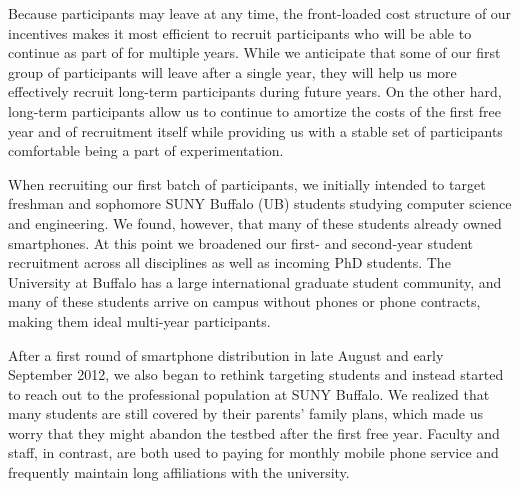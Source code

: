 Because participants may leave at any time, the front-loaded cost structure
of our incentives makes it most efficient to recruit participants who will be
able to continue as part of \PhoneLab{} for multiple years. While we
anticipate that some of our first group of participants will leave after a
single year, they will help us more effectively recruit long-term
participants during future years. On the other hard, long-term participants
allow us to continue to amortize the costs of the first free year and of
recruitment itself while providing us with a stable set of participants
comfortable being a part of \PhoneLab{} experimentation.

When recruiting our first batch of participants, we initially intended to
target freshman and sophomore SUNY Buffalo (UB) students studying computer
science and engineering. We found, however, that many of these students
already owned smartphones. At this point we broadened our first- and
second-year student recruitment across all disciplines as well as incoming
PhD students. The University at Buffalo has a large international graduate
student community, and many of these students arrive on campus without phones
or phone contracts, making them ideal multi-year \PhoneLab{} participants.

After a first round of smartphone distribution in late August and early
September 2012, we also began to rethink targeting students and instead
started to reach out to the professional population at SUNY Buffalo. We
realized that many students are still covered by their parents' family plans,
which made us worry that they might abandon the testbed after the first free
year. Faculty and staff, in contrast, are both used to paying for monthly
mobile phone service and frequently maintain long affiliations with the
university.

